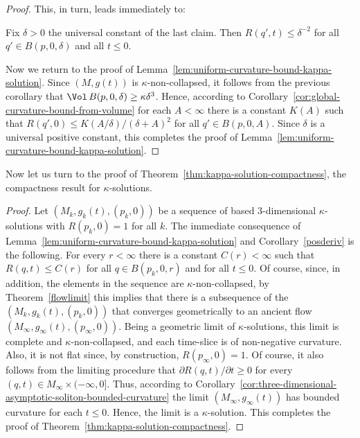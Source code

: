 \begin{proof}
This, in turn, leads immediately to:

\begin{corollary}\label{cor:curvature-bound-fixed-ball}
\label{rho}
Fix $\delta>0$ the universal constant of the last
claim. Then $R(q',t)\le \delta^{-2}$ for all $q'\in B(p,0,\delta)$
and all $t\le 0$.
\end{corollary}

Now we return to the proof of Lemma~\ref{lem:uniform-curvature-bound-kappa-solution}. Since
$(M,g(t))$ is $\kappa$-non-collapsed, it follows from the previous
corollary that $\Vol\,B(p,0,\delta)\ge \kappa \delta^3$. Hence,
according to Corollary~\ref{cor:global-curvature-bound-from-volume} for each $A<\infty$ there is a
constant $K(A)$ such that $R(q',0)\le K(A/\delta)/(\delta+A)^2$ for
all $q'\in B(p,0,A)$. Since $\delta$ is a universal positive
constant, this completes the proof of Lemma~\ref{lem:uniform-curvature-bound-kappa-solution}.
\end{proof}

Now let us turn to the proof of Theorem~\ref{thm:kappa-solution-compactness}, the
compactness result for $\kappa$-solutions.

\begin{proof}
 Let
$(M_k,g_k(t),(p_k,0))$ be a sequence of based $3$-dimensional
$\kappa$-solutions with $R(p_k,0)=1$ for all $k$.
 The immediate
consequence of Lemma~\ref{lem:uniform-curvature-bound-kappa-solution} and Corollary~\ref{posderiv}
is the following. For every $r<\infty$ there is a constant
$C(r)<\infty$ such that $R(q,t)\le C(r)$ for all $q\in B(p_k,0,r)$
and for all $t\le 0$. Of course, since, in addition, the elements in
the sequence are $\kappa$-non-collapsed, by Theorem~\ref{flowlimit}
this implies that there is a subsequence of the
$(M_k,g_k(t),(p_k,0))$ that converges geometrically to an ancient
flow $(M_\infty,g_\infty(t),(p_\infty,0))$. Being a geometric limit
of $\kappa$-solutions, this limit is complete and
$\kappa$-non-collapsed, and each time-slice is of non-negative
curvature. Also, it is not flat since, by construction,
$R(p_\infty,0)=1$. Of course, it also follows from the limiting
procedure that $\partial R(q,t)/\partial t\ge 0$ for every $(q,t)\in
M_\infty\times(-\infty,0]$. Thus, according to
Corollary~\ref{cor:three-dimensional-asymptotic-soliton-bounded-curvature} the limit
 $(M_\infty,g_\infty(t))$ has bounded curvature for each $t\le 0$.
Hence, the limit is a $\kappa$-solution. This completes the proof of
Theorem~\ref{thm:kappa-solution-compactness}.
\end{proof}

